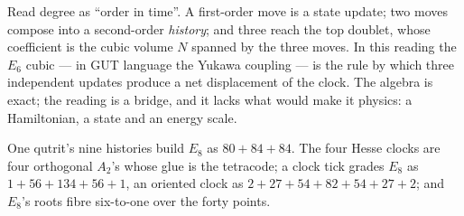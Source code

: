 \begin{physical}
Read degree as ``order in time''. A first-order move is a state update; two moves compose
into a second-order \emph{history}; and three reach the top doublet, whose coefficient is
the cubic volume $N$ spanned by the three moves. In this reading the $E_6$ cubic --- in
GUT language the Yukawa coupling --- is the rule by which three independent updates
produce a net displacement of the clock. The algebra is exact; the reading is a bridge,
and it lacks what would make it physics: a Hamiltonian, a state and an energy scale.
\tierB
\end{physical}

\begin{keyidea}
One qutrit's nine histories build $E_8$ as $80+84+84$. The four Hesse clocks are four
orthogonal $A_2$'s whose glue is the tetracode; a clock tick grades $E_8$ as
$1+56+134+56+1$, an oriented clock as $2+27+54+82+54+27+2$; and $E_8$'s roots fibre
six-to-one over the forty points.
\end{keyidea}
